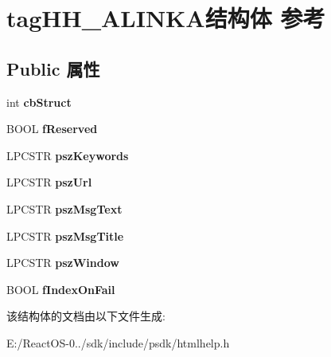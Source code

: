 \hypertarget{structtag_h_h___a_l_i_n_k_a}{}\section{tag\+H\+H\+\_\+\+A\+L\+I\+N\+K\+A结构体 参考}
\label{structtag_h_h___a_l_i_n_k_a}
\subsection*{Public 属性}
\begin{DoxyCompactItemize}
\item 
\mbox{\label{structtag_h_h___a_l_i_n_k_a_ae47ef3e9bde94d6e4d98812d53b2d597}} 
int {\bfseries cb\+Struct}
\item 
\mbox{\label{structtag_h_h___a_l_i_n_k_a_ad7b14dd46b8c0f429639c30aa0115411}} 
B\+O\+OL {\bfseries f\+Reserved}
\item 
\mbox{\label{structtag_h_h___a_l_i_n_k_a_ac6344e2767a6cf50caede98fce9fe3f8}} 
L\+P\+C\+S\+TR {\bfseries psz\+Keywords}
\item 
\mbox{\label{structtag_h_h___a_l_i_n_k_a_ac2bf04b5dbbad1503ac7d9994117aade}} 
L\+P\+C\+S\+TR {\bfseries psz\+Url}
\item 
\mbox{\label{structtag_h_h___a_l_i_n_k_a_a76f896a156b969d7d716b9f10cab1d3c}} 
L\+P\+C\+S\+TR {\bfseries psz\+Msg\+Text}
\item 
\mbox{\label{structtag_h_h___a_l_i_n_k_a_af637c521d4cdd02374e8713f2ab346a1}} 
L\+P\+C\+S\+TR {\bfseries psz\+Msg\+Title}
\item 
\mbox{\label{structtag_h_h___a_l_i_n_k_a_aeb5020c79c21c2eeed6d5e56bc6246b7}} 
L\+P\+C\+S\+TR {\bfseries psz\+Window}
\item 
\mbox{\label{structtag_h_h___a_l_i_n_k_a_ad9efb6dec22b285b0f0ec343c46a61b4}} 
B\+O\+OL {\bfseries f\+Index\+On\+Fail}
\end{DoxyCompactItemize}


该结构体的文档由以下文件生成\+:\begin{DoxyCompactItemize}
\item 
E\+:/\+React\+O\+S-\/0../sdk/include/psdk/htmlhelp.\+h\end{DoxyCompactItemize}
